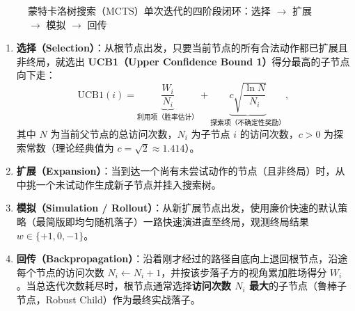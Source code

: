 \begin{figure}[htbp]
{}
\caption{蒙特卡洛树搜索（MCTS）单次迭代的四阶段闭环：选择 $\to$ 扩展 $\to$ 模拟 $\to$ 回传}\label{fig:mcts-cycle}
\end{figure}

\begin{enumerate}
  \item \textbf{选择（Selection）}：从根节点出发，只要当前节点的所有合法动作都已扩展且非终局，就选出 \textbf{UCB1（Upper Confidence Bound 1）}得分最高的子节点向下走：
  \begin{equation}\label{eq:ucb1}
    \mathrm{UCB1}(i) = \underbrace{\frac{W_i}{N_i}}_{\text{利用项（胜率估计）}} + \underbrace{c\sqrt{\frac{\ln N}{N_i}}}_{\text{探索项（不确定性奖励）}},
  \end{equation}
  其中 $N$ 为当前父节点的总访问次数，$N_i$ 为子节点 $i$ 的访问次数，$c > 0$ 为探索常数（理论经典值为 $c = \sqrt{2} \approx 1.414$）。
  \item \textbf{扩展（Expansion）}：当到达一个尚有未尝试动作的节点（且非终局）时，从中挑一个未试动作生成新子节点并挂入搜索树。
  \item \textbf{模拟（Simulation / Rollout）}：从新扩展节点出发，使用廉价快速的默认策略（最简版即均匀随机落子）一路快速演进直至终局，观测终局结果 $w \in \{+1, 0, -1\}$。
  \item \textbf{回传（Backpropagation）}：沿着刚才经过的路径自底向上退回根节点，沿途每个节点的访问次数 $N_i \leftarrow N_i + 1$，并按该步落子方的视角累加胜场得分 $W_i$。当总迭代次数耗尽时，根节点通常选择\textbf{访问次数 $N_i$ 最大}的子节点（鲁棒子节点，Robust Child）作为最终实战落子。
\end{enumerate}

